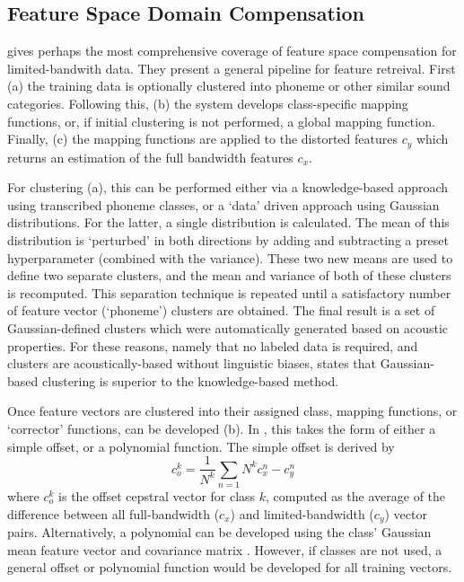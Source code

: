 \subsection{Feature Space Domain Compensation}\label{sec:feat-space-comp}

\cite{morales:09} gives perhaps the most comprehensive coverage of feature space compensation for limited-bandwith data.  They present a general pipeline for feature retreival.  First (a) the training data is optionally clustered into phoneme or other similar sound categories.  Following this, (b) the system develops class-specific mapping functions, or, if initial clustering is not performed, a global mapping function.  Finally, (c) the mapping functions are applied to the distorted features $c_y$ which returns an estimation of the full bandwidth features $c_x$.

For clustering (a), this can be performed either via a knowledge-based approach using transcribed phoneme classes, or a `data' driven approach using Gaussian distributions.  For the latter, a single distribution is calculated.  The mean of this distribution is `perturbed' in both directions by adding and subtracting a preset hyperparameter (combined with the variance).  These two new means are used to define two separate clusters, and the mean and variance of both of these clusters is recomputed.  This separation technique is repeated until a satisfactory number of feature vector (`phoneme') clusters are obtained.  The final result is a set of Gaussian-defined clusters which were automatically generated based on acoustic properties.  For these reasons, namely that no labeled data is required, and clusters are acoustically-based without linguistic biases, \cite{morales:05b} states that Gaussian-based clustering is superior to the knowledge-based method.

Once feature vectors are clustered into their assigned class, mapping functions, or `corrector' functions, can be developed (b).  In \cite{morales:05b}, this takes the form of either a simple offset, or a polynomial function.  The simple offset is derived by \begin{equation} c_o^k = \dfrac{1}{N^k} \sum_{n=1}{N^k} c_x^n - c_y^n \end{equation} where $c_o^k$ is the offset cepstral vector for class $k$, computed as the average of the difference between all full-bandwidth ($c_x$) and limited-bandwidth ($c_y$) vector pairs.  Alternatively, a polynomial can be developed using the class' Gaussian mean feature vector and covariance matrix \cite{morales:05b,morales:09}.  However, if classes are not used, a general offset or polynomial function would be developed for all training vectors.

